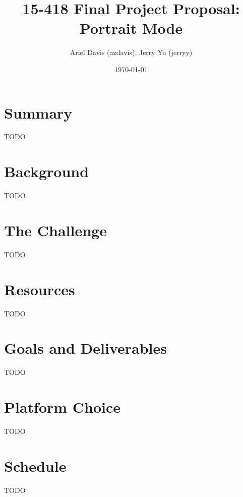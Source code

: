 \documentclass[12pt]{article}
\author{Ariel Davis (azdavis), Jerry Yu (jerryy)}
\date{\today}
\title{15-418 Final Project Proposal: Portrait Mode}
\begin{document}
\maketitle

\section*{Summary}

TODO

\section*{Background}

TODO

\section*{The Challenge}

TODO

\section*{Resources}

TODO

\section*{Goals and Deliverables}

TODO

\section*{Platform Choice}

TODO

\section*{Schedule}

TODO
\end{document}

